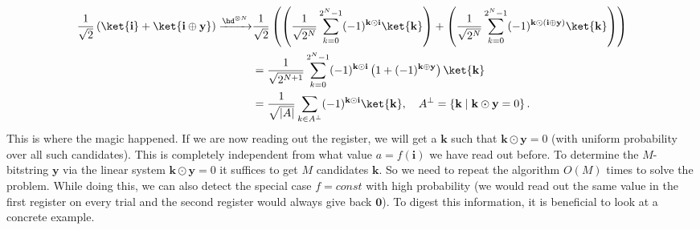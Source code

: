\begin{align}
        \frac{1}{\sqrt{2}} \left( \ket{\mathbf{i}} + \ket{\mathbf{i \oplus y}}\right) \xrightarrow[]{\hd^{\otimes N}}& \frac{1}{\sqrt{2}}\left( \left(\frac{1}{\sqrt{2^N}}\sum_{k=0}^{2^N-1} (-1)^{\mathbf{k}\odot \mathbf{i}}\ket{\mathbf{k}}\right) +\left(\frac{1}{\sqrt{2^N}}\sum_{k=0}^{2^N-1} (-1)^{\mathbf{k}\odot( \mathbf{i}\oplus\mathbf{y})}\ket{\mathbf{k}}\right) \right)\nonumber\\
        &= \frac{1}{\sqrt{2^{N+1}}}\sum_{k=0}^{2^N-1} (-1)^{\mathbf{k\odot i}} \left(1+(-1)^{\mathbf{k}\oplus \mathbf{y}}\right) \ket{\mathbf{k}} \nonumber\\
        & = \frac{1}{\sqrt{|A|}} \sum_{k\in A^\perp} (-1)^{\mathbf{k\odot i}} \ket{\mathbf{k}}, \quad A^\perp = \left\{\mathbf{k} \;|\; \mathbf{k} \odot \mathbf{y} = 0\right\}.
\end{align}
This is where the magic happened. If we are now reading out the register, we will get a $\mathbf{k}$ such that $\mathbf{k\odot \mathbf{y}}=0$ (with uniform probability over all such candidates). This is completely independent from what value $a=f(\mathbf{i})$ we have read out before. To determine the $M$-bitstring $\mathbf{y}$ via the linear system $\mathbf{k\odot \mathbf{y}}=0$ it suffices to get $M$ candidates $\mathbf{k}$. So we need to repeat the algorithm $O(M)$ times to solve the problem. While doing this, we can also detect the special case $f=const$ with high probability (we would read out the same value in the first register on every trial and the second register would always give back $\mathbf{0}$).
To digest this information, it is beneficial to look at a concrete example.

